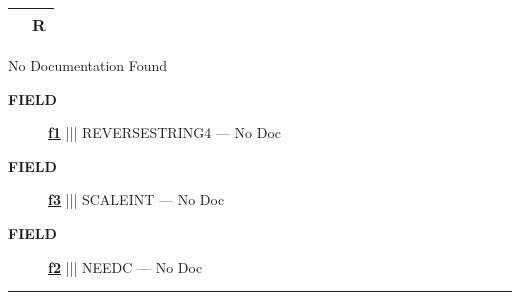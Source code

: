 {\renewcommand{\arraystretch}{1.5}
\begin{tabularx}{\textwidth}{|>{\raggedright\arraybackslash}l|X|}
\hline
\hspace{0pt}\mytexttt{\color{red} } & \textbf{R} \\
\hline
\end{tabularx}
}

\par





No Documentation Found







\par
\begin{description}
\item [\colorbox{tagtype}{\color{white} \textbf{\textsf{FIELD}}}] \textbf{\underline{f1}} ||| REVERSESTRING4 --- No Doc
\item [\colorbox{tagtype}{\color{white} \textbf{\textsf{FIELD}}}] \textbf{\underline{f3}} ||| SCALEINT --- No Doc
\item [\colorbox{tagtype}{\color{white} \textbf{\textsf{FIELD}}}] \textbf{\underline{f2}} ||| NEEDC --- No Doc
\end{description}





\rule{\linewidth}{0.5pt}


